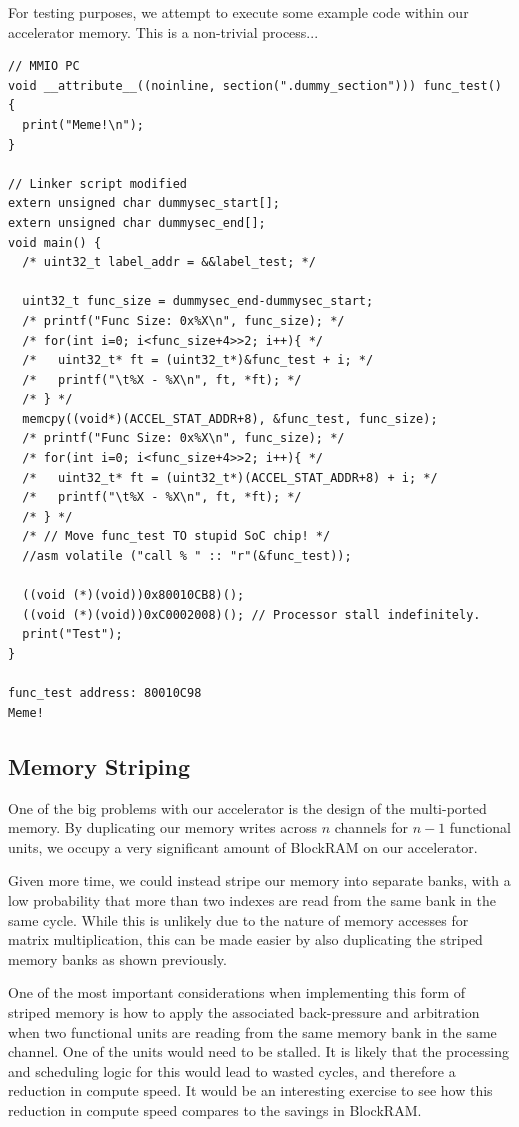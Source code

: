 \documentclass[a4paper,8pt]{report}
\begin{document}
For testing purposes, we attempt to execute some example code within our
accelerator memory. This is a non-trivial process...
\begin{verbatim}
// MMIO PC
void __attribute__((noinline, section(".dummy_section"))) func_test() {
  print("Meme!\n");
}

// Linker script modified
extern unsigned char dummysec_start[];
extern unsigned char dummysec_end[];
void main() {
  /* uint32_t label_addr = &&label_test; */

  uint32_t func_size = dummysec_end-dummysec_start;
  /* printf("Func Size: 0x%X\n", func_size); */
  /* for(int i=0; i<func_size+4>>2; i++){ */
  /*   uint32_t* ft = (uint32_t*)&func_test + i; */
  /*   printf("\t%X - %X\n", ft, *ft); */
  /* } */
  memcpy((void*)(ACCEL_STAT_ADDR+8), &func_test, func_size);
  /* printf("Func Size: 0x%X\n", func_size); */
  /* for(int i=0; i<func_size+4>>2; i++){ */
  /*   uint32_t* ft = (uint32_t*)(ACCEL_STAT_ADDR+8) + i; */
  /*   printf("\t%X - %X\n", ft, *ft); */
  /* } */
  /* // Move func_test TO stupid SoC chip! */
  //asm volatile ("call % " :: "r"(&func_test));

  ((void (*)(void))0x80010CB8)();
  ((void (*)(void))0xC0002008)(); // Processor stall indefinitely.
  print("Test");
}

func_test address: 80010C98
Meme!
\end{verbatim}

\subsection{Memory Striping}
One of the big problems with our accelerator is the design of the multi-ported
memory. By duplicating our memory writes across $n$ channels for $n-1$
functional units, we occupy a very significant amount of BlockRAM on our
accelerator.

Given more time, we could instead stripe our memory into separate banks, with a
low probability that more than two indexes are read from the same bank in the
same cycle. While this is unlikely due to the nature of memory accesses for matrix
multiplication, this can be made easier by also duplicating the striped memory
banks as shown previously.

One of the most important considerations when implementing this form of striped
memory is how to apply the associated back-pressure and arbitration when two functional units
are reading from the same memory bank in the same channel. One of the units
would need to be stalled. It is likely that the processing and scheduling logic
for this would lead to wasted cycles, and therefore a reduction in compute
speed. It would be an interesting exercise to see how this reduction in compute
speed compares to the savings in BlockRAM.
\end{document}
